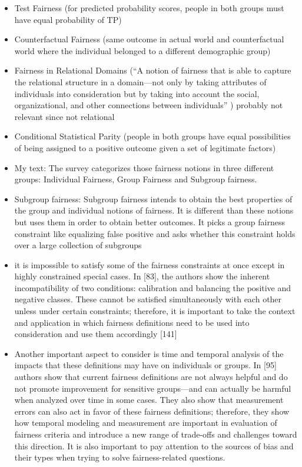 \documentclass[12pt, a4paper, oneside]{book}   	%
\newif\ifrawcitationactive
\newcommand{\rawcitationend}{\color{black}\rawcitationactivefalse}
\begin{document}
\begin{itemize}
\begin{itemize}
					\item Test Fairness (for predicted probability scores, people in both groups must have equal probability of TP) \autocite{Mehrabi_2021}
					\item Counterfactual Fairness (same outcome in actual world and counterfactual world where the individual belonged to a different demographic group) \autocite{Mehrabi_2021}
					\item Fairness in Relational Domains (“A notion of fairness that is able to capture the relational structure in a domain—not only by taking attributes of individuals into consideration but by taking into account the social, organizational, and other connections between individuals” \autocite{M50_Farnadi_2018}) \autocite{Mehrabi_2021} probably not relevant since not relational
					\item Conditional Statistical Parity (people in both groups have equal possibilities of being assigned to a positive outcome given a set of legitimate factors) \autocite{Mehrabi_2021}
					\item My text: The survey categorizes those fairness notions in three different groups: Individual Fairness, Group Fairness and Subgroup fairness.  \autocite{Mehrabi_2021}
					\item Subgroup fairness: Subgroup fairness intends to obtain the best properties of the group and individual notions of fairness. It is different than these notions but uses them in order to obtain better outcomes. It picks a group fairness constraint like equalizing false positive and asks whether this constraint holds over a large collection of subgroups \autocite{M79_Kearns_2018}\autocite{M80_Kearns_2019}\autocite{Mehrabi_2021}
					\item it is impossible to satisfy some of the fairness constraints at once except in highly constrained special cases. In [83], the authors show the inherent incompatibility of two conditions: calibration and balancing the positive and negative classes. These cannot be satisfied simultaneously with each other unless under certain constraints; therefore, it is important to take the context and application in which fairness definitions need to be used into consideration and use them accordingly [141]\autocite{Mehrabi_2021}
					\item Another important aspect to consider is time and temporal analysis of the impacts that these definitions may have on individuals or groups. In [95] authors show that current fairness definitions are not always helpful and do not promote improvement for sensitive groups—and can actually be harmful when analyzed over time in some cases. They also show that measurement errors can also act in favor of these fairness definitions; therefore, they show how temporal modeling and measurement are important in evaluation of fairness criteria and introduce a new range of trade-offs and challenges toward this direction. It is also important to pay attention to the sources of bias and their types when trying to solve fairness-related questions. \autocite{Mehrabi_2021}
				\end{itemize}
			\end{itemize}
			\rawcitationend
			
\end{document}
